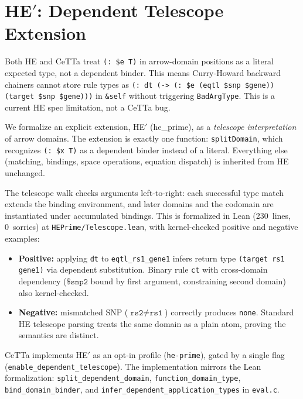 \documentclass[11pt]{article}
\newcommand{\code}[1]{\texttt{#1}}
\newcommand{\CeTTa}{\textup{CeTTa}}
\begin{document}
\section{HE$'$: Dependent Telescope Extension}
\label{sec:heprime}

Both HE and \CeTTa{} treat \code{(: \$e T)} in arrow-domain positions as a
literal expected type, not a dependent binder.  This means Curry-Howard
backward chainers cannot store rule types as \code{(: dt (-> (: \$e
(eqtl \$snp \$gene)) (target \$snp \$gene)))} in \code{\&self} without
triggering \code{BadArgType}.  This is a current HE spec limitation, not
a \CeTTa{} bug.

We formalize an explicit extension, HE$'$ (he\_prime), as a
\emph{telescope interpretation} of arrow domains.  The extension is
exactly one function: \code{splitDomain}, which recognizes \code{(: \$x
T)} as a dependent binder instead of a literal.  Everything else
(matching, bindings, space operations, equation dispatch) is inherited
from HE unchanged.

The telescope walk checks arguments left-to-right: each successful
type match extends the binding environment, and later domains and the
codomain are instantiated under accumulated bindings.  This is
formalized in Lean (230~lines, 0~sorries) at
\code{HEPrime/Telescope.lean}, with kernel-checked positive and
negative examples:

\begin{itemize}
\item \textbf{Positive:} applying \code{dt} to \code{eqtl\_rs1\_gene1}
  infers return type \code{(target rs1 gene1)} via dependent
  substitution.  Binary rule \code{ct} with cross-domain dependency
  ($\code{\$snp2}$ bound by first argument, constraining second domain)
  also kernel-checked.
\item \textbf{Negative:} mismatched SNP ($\code{rs2} \neq \code{rs1}$)
  correctly produces \code{none}.  Standard HE telescope parsing treats
  the same domain as a plain atom, proving the semantics are distinct.
\end{itemize}

\CeTTa{} implements HE$'$ as an opt-in profile (\code{he-prime}),
gated by a single flag (\code{enable\_dependent\_telescope}).  The
implementation mirrors the Lean formalization: \code{split\_dependent\_domain},
\code{function\_domain\_type}, \code{bind\_domain\_binder}, and
\code{infer\_dependent\_application\_types} in \code{eval.c}.
\end{document}
